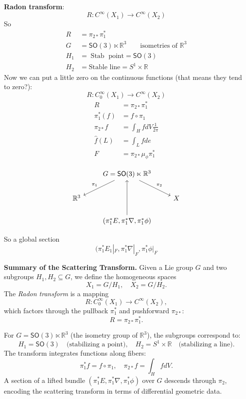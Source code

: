 \textbf{Radon transform}:
\[R: C^\infty(X_1) \longrightarrow C^\infty(X_2)\]
So
\begin{align*}
R&=\pi_{2 *}\pi_1^*\\
G&=\mathsf{SO}(3)\ltimes \mathbb{R}^3\qquad  \text{isometries of \(\mathbb{R}^3\)} \\
H_1&=\operatorname{S t a b} \text{ point} = \mathsf{SO}(3)\\
H_2&=\text{Stable line} =S^1 \times \mathbb{R}
\end{align*}
Now we can put a little zero on the continuous functions (that means they tend to zero?):
\[R: C_0^\infty(X_1) \longrightarrow C^\infty(X_2)\]
\begin{align*}
R&=\pi_{2*}\pi_1^* \\
\pi_1^* (f)&=f \circ \pi_1\\
\pi_{2*}f&=\int_HfdV\frac{1}{2\pi}\\
\hat{f}(L)&=\int_Lfde\\
F&=\pi_{2*}\mu_{\phi}\pi_1^*
\end{align*}


\[\begin{tikzcd}
&G=\mathsf{SO}(3)\ltimes \mathbb{R}^3\arrow[dl,"\pi_1",swap]\arrow[dr,"\pi_2"]\\
\mathbb{R}^3&&X\\
&(\pi_1 ^*E,\pi_1^*\nabla,\pi^*_1\phi)\arrow[uu]
\end{tikzcd}\]

So a global section
\[(\pi_1^*E_1|_{F},\pi_1^*\nabla|_{F},\pi_1^*\phi|_{F}\]

\textbf{Summary of the Scattering Transform.} Given a Lie group \( G \) and two subgroups \( H_1, H_2 \subseteq G \), we define the homogeneous spaces
\[
X_1 = G/H_1, \quad X_2 = G/H_2.
\]
The \textit{Radon transform} is a mapping
\[
R: C^\infty_0(X_1) \to C^\infty(X_2),
\]
which factors through the pullback \(\pi_1^*\) and pushforward \(\pi_{2*}\):
\[
R = \pi_{2*} \pi_1^*.
\]

For \( G = \mathsf{SO}(3) \ltimes \mathbb{R}^3 \) (the isometry group of \( \mathbb{R}^3 \)), the subgroups correspond to:
\[
H_1 = \mathsf{SO}(3) \quad \text{(stabilizing a point)}, \quad H_2 = S^1 \times \mathbb{R} \quad \text{(stabilizing a line)}.
\]
The transform integrates functions along fibers:
\[
\pi_1^* f = f \circ \pi_1, \quad \pi_{2*} f = \int_H f dV.
\]
A section of a lifted bundle \((\pi_1^*E, \pi_1^*\nabla, \pi_1^*\phi)\) over \( G \) descends through \( \pi_2 \), encoding the scattering transform in terms of differential geometric data.



